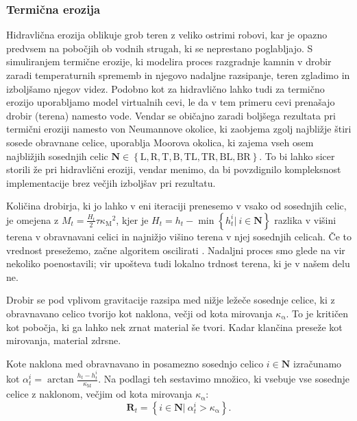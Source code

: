 \documentclass[9pt]{pnas-new}
\newcommand{\set}[1]{\ensuremath{\mathbf{#1}}}
\newcommand{\const}[1]{{\ensuremath{\kappa_\mathrm{#1}}}}
\begin{document}
\subsubsection*{Termična erozija}
Hidravlična erozija oblikuje grob teren z veliko ostrimi robovi, kar je opazno predvsem na pobočjih ob vodnih strugah, ki se neprestano poglabljajo. S simuliranjem termične erozije, ki modelira proces razgradnje kamnin v drobir zaradi temperaturnih sprememb in njegovo nadaljne razsipanje, teren zgladimo in izboljšamo njegov videz. Podobno kot za hidravlično lahko tudi za termično erozijo uporabljamo model virtualnih cevi, le da v tem primeru cevi prenašajo drobir (terena) namesto vode. Vendar se običajno \cite{jako_fast_gpu_11,maske_2013} zaradi boljšega rezultata pri termični eroziji namesto von Neumannove okolice, ki zaobjema zgolj najbližje štiri sosede obravnane celice, uporablja Moorova okolica, ki zajema vseh osem najbližjih sosednjih celic $\set{N} \in \left\{\mathrm{L},\mathrm{R},\mathrm{T},\mathrm{B}, \mathrm{TL},\mathrm{TR},\mathrm{BL},\mathrm{BR}\right\}$. To bi lahko sicer storili že pri hidravlični eroziji, vendar menimo, da bi povzdignilo kompleksnost implementacije brez večjih izboljšav pri rezultatu. 

Količina drobirja, ki jo lahko v eni iteraciji prenesemo v vsako od sosednjih celic, je omejena z $M_t = \frac{H_t}{2} \tau \const{M}^2$, kjer je $H_t = h_t - \min\left\{ h^i_t|\ i \in \set{N} \right\}$ razlika v višini terena v obravnavani celici in najnižjo višino terena v njej sosednjih celicah. Če to vrednost presežemo, začne algoritem oscilirati \cite{jako_fast_gpu_11}. Nadaljni proces smo glede na vir \cite{jako_fast_gpu_11} nekoliko poenostavili; vir upošteva tudi lokalno trdnost terena, ki je v našem delu ne.

Drobir se pod vplivom gravitacije razsipa med nižje ležeče sosednje celice, ki z obravnavano celico tvorijo kot naklona, večji od kota mirovanja $\const{\alpha}$. To je kritičen kot pobočja, ki ga lahko nek zrnat material še tvori. Kadar klančina preseže kot mirovanja, material zdrsne. %

Kote naklona med obravnavano in posamezno sosednjo celico $i \in \set{N}$ izračunamo kot $\alpha^i_t = \arctan \frac{h_t - h_t^i}{\const{M}}$.
Na podlagi teh sestavimo množico, ki vsebuje vse sosednje celice z naklonom, večjim od kota mirovanja $\const{\alpha}$:
\begin{equation}
\set{R}_t =\left\{i \in \mathbf{N}|\ \alpha^i_t > \const{\alpha}\right\}.
\end{equation}
\end{document}
